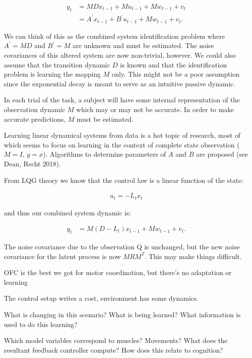 \documentclass[../main.tex]{subfiles}
\begin{document}
{{{\begin{align*}
y_t &= MDx_{t-1} + Mu_{t-1} + Mw_{t-1} + v_t \\
&= A^\prime x_{t-1} + B^\prime u_{t-1} + Mw_{t-1} + v_t.
\end{align*}

We can think of this as the combined system identification problem where $A^\prime=MD$ and $B^\prime=M$ are unknown and must be estimated. The noise covariances of this altered system are now non-trivial, however. We could also assume that the transition dynamic $D$ is known and that the identification problem is learning the mapping $M$ only. This might not be a poor assumption since the exponential decay is meant to serve as an intuitive passive dynamic.

In each trial of the task, a subject will have some internal representation of the observation dynamic $M$ which may or may not be accurate. In order to make accurate predictions, $M$ must be estimated.

Learning linear dynamical systems from data is a hot topic of research, most of which seems to focus on learning in the context of complete state observation ($M=I$, $y=x$). Algorithms to determine parameters of $A$ and $B$ are proposed (see Dean, Recht 2018).

From LQG theory we know that the control law is a linear function of the state:

\begin{align*}
u_t = -L_tx_t
\end{align*}

and thus our combined system dynamic is:

\begin{align*}
y_t &= M(D-L_t)x_{t-1} + Mw_{t-1} + v_t.
\end{align*}


The noise covariance due to the observation Q is unchanged, but the new noise covariance for the latent process is now $MRM^T$. This may make things difficult. 





OFC is the best we got for motor coordination, but there's no adaptation or learning

The control setup writes a cost, environment has some dynamics. 

What is changing in this scenario?
What is being learned?
What information is used to do this learning?

Which model variables correspond to muscles? Movements?
What does the resultant feedback controller compute? How does this relate to cognition?

}}}
\end{document}
